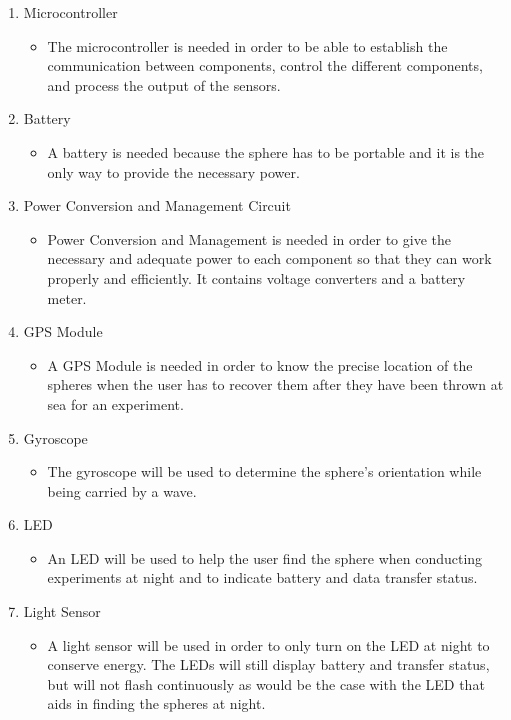 \begin{enumerate}
\item Microcontroller
	\begin{itemize}
		\item The microcontroller is needed in order to be able to establish the communication between components, control the different components, and process the output of the sensors.
	\end{itemize}

\item Battery
	\begin{itemize}
		\item A battery is needed because the sphere has to be portable and it is the only way to provide the necessary power.
	\end{itemize}

\item Power Conversion and Management Circuit
	\begin{itemize}
		\item Power Conversion and Management is needed in order to give the necessary and adequate power to each component so that they can work properly and efficiently.  It contains voltage converters and a battery meter.
	\end{itemize}
\item GPS Module
\begin{itemize}
\item A GPS Module is needed in order to know the precise location of the spheres when the user has to recover them after they have been thrown at sea for an experiment.
\end{itemize}
\item Gyroscope
\begin{itemize}
\item The gyroscope will be used to determine the sphere's orientation while being carried by a wave.
\end{itemize}
\item LED
\begin{itemize}
\item An LED will be used to help the user find the sphere when conducting experiments at night and to indicate battery and data transfer status.
\end{itemize}
\item Light Sensor
\begin{itemize}
\item A light sensor will be used in order to only turn on the LED at night to conserve energy.  The LEDs will still display battery and transfer status, but will not flash continuously as would be the case with the LED that aids in finding the spheres at night.

\end{itemize}
\end{enumerate}
